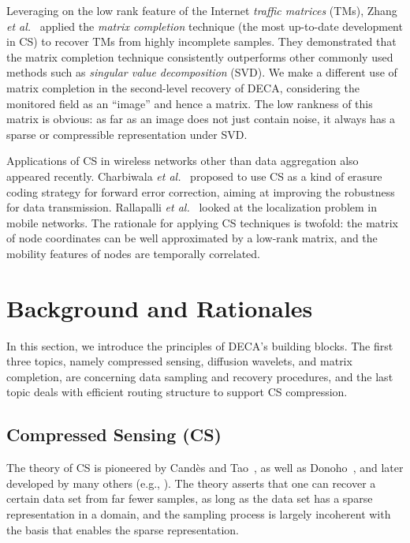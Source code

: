 \documentclass[conference]{IEEEtran}
\begin{document}
    Leveraging on the low rank feature of the Internet \textit{traffic matrices} (TMs), Zhang \textit{et al.}\ \cite{ZhangRWQ-SIGCOMM09} applied the \textit{matrix completion} technique (the most up-to-date development in CS) to recover TMs from highly incomplete samples. They demonstrated that the matrix completion technique consistently outperforms other commonly used methods such as \textit{singular value decomposition} (SVD). We make a different use of matrix completion in the second-level recovery of DECA, considering the monitored field as an ``image'' and hence a matrix. The low rankness of this matrix is obvious: as far as an image does not just contain noise, it always has a sparse or compressible representation under  SVD.

    Applications of CS in wireless networks other than data aggregation also appeared recently. Charbiwala \textit{et al.}\ \cite{CharbiwalaCZKSHB-Infocom10} proposed to use CS as a kind of erasure coding strategy for forward error correction, aiming at improving the robustness for data transmission. Rallapalli \textit{et al.}\ \cite{RallapalliQZC-MobiCom10} looked at the localization problem in mobile networks. The rationale for applying CS techniques is twofold: the matrix of node coordinates can be well approximated by a low-rank matrix, and the mobility features of nodes are temporally correlated.


\section{Background and Rationales} \label{sec:bgr}
In this section, we introduce the principles of DECA's building blocks. The first three topics, namely compressed sensing, diffusion wavelets, and matrix completion, are concerning data sampling and recovery procedures, and the last topic deals with efficient routing structure to support CS compression.

  \subsection{Compressed Sensing (CS)} \label{sec:cs}
The theory of CS is pioneered by Cand\`{e}s and Tao~\cite{CandesRT-TIT06}, as well as Donoho~\cite{Donoho-TIT06}, and later developed by many others (e.g., \cite{Haupt-SPMag08}). The theory asserts that one can recover a certain data set from far fewer samples, as long as the data set has a sparse representation in a domain, and the sampling process is largely incoherent with the basis that enables the sparse representation.
\end{document}
